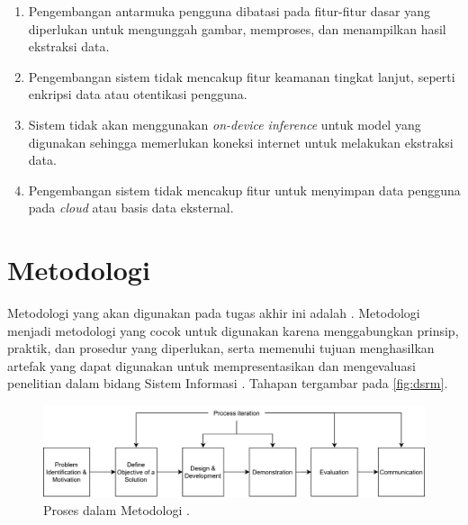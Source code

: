 \begin{enumerate}
	\item Pengembangan antarmuka pengguna dibatasi pada fitur-fitur dasar yang diperlukan untuk mengunggah gambar, memproses, dan menampilkan hasil ekstraksi data.
	\item Pengembangan sistem tidak mencakup fitur keamanan tingkat lanjut, seperti enkripsi data atau otentikasi pengguna.
	\item Sistem tidak akan menggunakan \emph{on-device inference} untuk model \dl{} yang digunakan sehingga memerlukan koneksi internet untuk melakukan ekstraksi data.
	\item Pengembangan sistem tidak mencakup fitur untuk menyimpan data pengguna pada \emph{cloud} atau basis data eksternal.
\end{enumerate}

\section{Metodologi}
\label{sec:metodologi}

Metodologi yang akan digunakan pada tugas akhir ini adalah \dsrmfull. Metodologi \dsrm{} menjadi metodologi yang cocok untuk digunakan karena menggabungkan prinsip, praktik, dan prosedur yang diperlukan, serta memenuhi tujuan menghasilkan artefak yang dapat digunakan untuk mempresentasikan dan mengevaluasi penelitian dalam bidang Sistem Informasi \parencite{peffers2007dsrm}. Tahapan \dsrm{} tergambar pada \autoref{fig:dsrm}.

\begin{figure}[htbp]
	\centering
	\includegraphics[width=.8\textwidth]{images/dsrm.png}
	\caption{Proses dalam Metodologi \dsrm{} \parencite{peffers2007dsrm}.}
	\label{fig:dsrm}
\end{figure}

